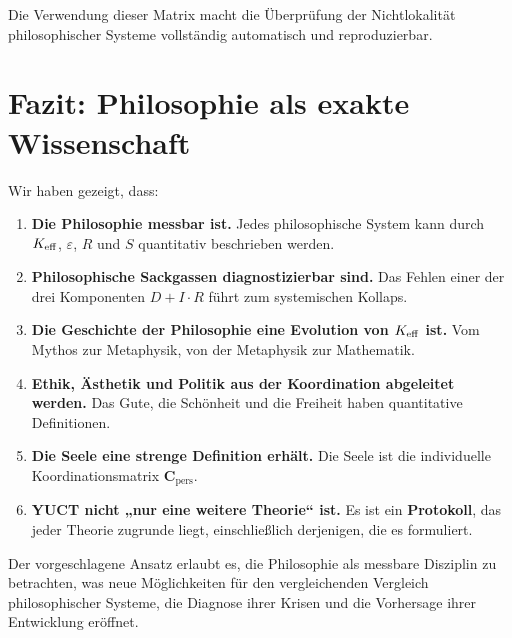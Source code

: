 \documentclass[12pt,a4paper]{article}
\newcommand{\eps}{\varepsilon}
\newcommand{\Cpers}{\mathbf{C}_{\text{pers}}}
\begin{document}
	Die Verwendung dieser Matrix macht die Überprüfung der Nichtlokalität philosophischer Systeme vollständig automatisch und reproduzierbar.
	
	
	\section{Fazit: Philosophie als exakte Wissenschaft}
	
	Wir haben gezeigt, dass:
	
	\begin{enumerate}
		\item \textbf{Die Philosophie messbar ist.} Jedes philosophische System kann durch \(\Keff\), \(\eps\), \(R\) und \(S\) quantitativ beschrieben werden.
		\item \textbf{Philosophische Sackgassen diagnostizierbar sind.} Das Fehlen einer der drei Komponenten \(D + I \cdot R\) führt zum systemischen Kollaps.
		\item \textbf{Die Geschichte der Philosophie eine Evolution von \(\Keff\) ist.} Vom Mythos zur Metaphysik, von der Metaphysik zur Mathematik.
		\item \textbf{Ethik, Ästhetik und Politik aus der Koordination abgeleitet werden.} Das Gute, die Schönheit und die Freiheit haben quantitative Definitionen.
		\item \textbf{Die Seele eine strenge Definition erhält.} Die Seele ist die individuelle Koordinationsmatrix \(\Cpers\).
		\item \textbf{YUCT nicht „nur eine weitere Theorie“ ist.} Es ist ein \textbf{Protokoll}, das jeder Theorie zugrunde liegt, einschließlich derjenigen, die es formuliert.
	\end{enumerate}
	
	Der vorgeschlagene Ansatz erlaubt es, die Philosophie als messbare Disziplin zu betrachten, was neue Möglichkeiten für den vergleichenden Vergleich philosophischer Systeme, die Diagnose ihrer Krisen und die Vorhersage ihrer Entwicklung eröffnet.
	
	\begin{center}
	\end{center}
	
\end{document}
